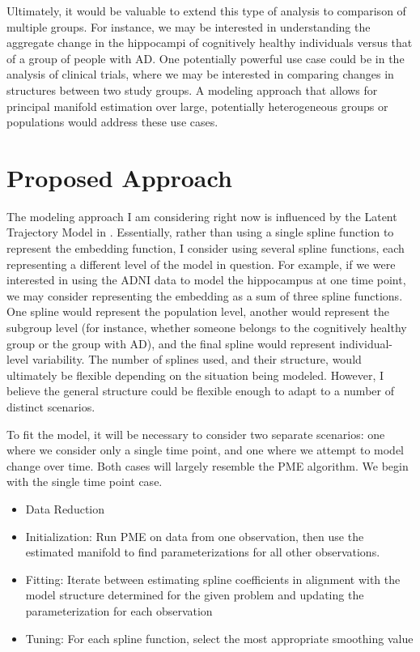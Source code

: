 \documentclass[11pt, reqno]{article}
\begin{document}
Ultimately, it would be valuable to extend this type of analysis to comparison of multiple groups. For instance, we may be interested in understanding the aggregate change in the hippocampi of cognitively healthy individuals versus that of a group of people with AD. One potentially powerful use case could be in the analysis of clinical trials, where we may be interested in comparing changes in structures between two study groups. A modeling approach that allows for principal manifold estimation over large, potentially heterogeneous groups or populations would address these use cases.

\section{Proposed Approach}

The modeling approach I am considering right now is influenced by the Latent Trajectory Model in \cite{schulamIntegrativeAnalysisUsing2016}. Essentially, rather than using a single spline function to represent the embedding function, I consider using several spline functions, each representing a different level of the model in question. For example, if we were interested in using the ADNI data to model the hippocampus at one time point, we may consider representing the embedding as a sum of three spline functions. One spline would represent the population level, another would represent the subgroup level (for instance, whether someone belongs to the cognitively healthy group or the group with AD), and the final spline would represent individual-level variability. The number of splines used, and their structure, would ultimately be flexible depending on the situation being modeled. However, I believe the general structure could be flexible enough to adapt to a number of distinct scenarios.

To fit the model, it will be necessary to consider two separate scenarios: one where we consider only a single time point, and one where we attempt to model change over time. Both cases will largely resemble the PME algorithm. We begin with the single time point case.

\begin{itemize}
  \item Data Reduction
  \item Initialization: Run PME on data from one observation, then use the estimated manifold to find parameterizations for all other observations.
  \item Fitting: Iterate between estimating spline coefficients in alignment with the model structure determined for the given problem and updating the parameterization for each observation
  \item Tuning: For each spline function, select the most appropriate smoothing value
\end{itemize}
\end{document}
